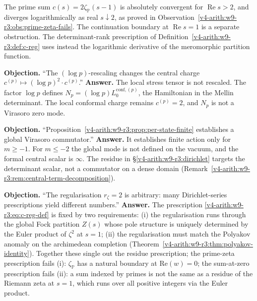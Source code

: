 \begin{remark}
\label{v4-arith:w9-r3:obstruction-1}
The prime sum \(c(s)=2\zeta_{\mathbb P}(s-1)\) is absolutely
convergent for \(\operatorname{Re}s>2\), and diverges
logarithmically as real \(s\downarrow2\), as proved in
Observation~\ref{v4-arith:w9-r3:obs:prime-zeta-fails}.
The continuation boundary at \(\operatorname{Re}s=1\) is a
separate obstruction. The determinant-rank prescription of
Definition~\ref{v4-arith:w9-r3:def:c-reg} uses instead the
logarithmic derivative of the meromorphic partition function.
\end{remark}

\begin{remark}
\label{v4-arith:w9-r3:obstruction-2}
\textbf{Objection.} ``The \((\log p)\)-rescaling changes the central
charge \(c^{(p)}\mapsto(\log p)^{2}\cdot c^{(p)}\).''
\textbf{Answer.} The local stress tensor is not rescaled. The factor
\(\log p\) defines \(N_{p}=(\log p)L_{0}^{\mathrm{conf},(p)}\), the
Hamiltonian in the Mellin determinant. The local conformal charge
remains \(c^{(p)}=2\), and \(N_{p}\) is not a Virasoro zero mode.
\end{remark}

\begin{remark}
\label{v4-arith:w9-r3:obstruction-3}
\textbf{Objection.} ``Proposition~\ref{v4-arith:w9-r3:prop:per-state-finite}
establishes a global Virasoro commutator.''
\textbf{Answer.} It establishes finite action only for
\(m\geq -1\). For \(m\leq -2\) the global mode is not defined on the
vacuum, and the formal central scalar is \(\infty\). The residue in
\S\ref{v4-arith:w9-r3:dirichlet} targets the determinant scalar, not
a commutator on a dense domain
(Remark~\ref{v4-arith:w9-r3:rem:central-term-decomposition}).
\end{remark}

\begin{remark}
\label{v4-arith:w9-r3:obstruction-4}
\textbf{Objection.} ``The regularisation \(r_{\zeta}=2\) is
arbitrary: many Dirichlet-series prescriptions yield different
numbers.''
\textbf{Answer.} The prescription
\eqref{v4-arith:w9-r3:eq:c-reg-def} is fixed by two requirements:
(i) the regularisation runs through the global Fock partition
\(Z(s)\) whose pole structure is uniquely determined by the Euler
product of \(\zeta^{2}\) at \(s=1\); (ii) the regularisation must
match the Polyakov anomaly on the archimedean completion
(Theorem~\ref{v4-arith:w9-r3:thm:polyakov-identity}). Together these
single out the residue prescription; the prime-zeta prescription
fails (i): \(\zeta_{\mathbb{P}}\) has a natural boundary at \(\mathrm{Re}(w)=0\);
the sum-at-zero prescription fails (ii): a sum indexed by primes
is not the same as a residue of the Riemann zeta at \(s=1\), which
runs over all positive integers via the Euler product.
\end{remark}

